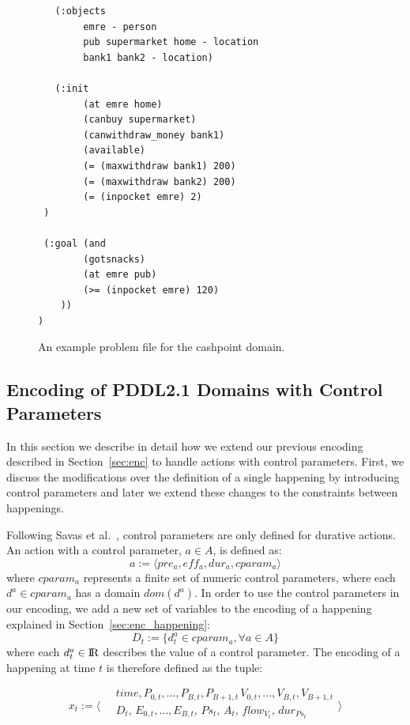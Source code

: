 \begin{figure}[thb]
\small
\begin{verbatim}
   (:objects
        emre - person
        pub supermarket home - location
        bank1 bank2 - location)
 
   (:init
        (at emre home)
        (canbuy supermarket)
        (canwithdraw_money bank1)
 		(available)
        (= (maxwithdraw bank1) 200)
        (= (maxwithdraw bank2) 200)
        (= (inpocket emre) 2)
 )
		
 (:goal (and
        (gotsnacks)
        (at emre pub)
        (>= (inpocket emre) 120)
    ))
)      
\end{verbatim}
\caption{An example problem file for the cashpoint domain.}
\label{fig:cashpoint problem}
\end{figure}

\subsection{Encoding of PDDL2.1 Domains with Control Parameters}

In this section we describe in detail how we extend our previous encoding described in Section~\ref{sec:enc} to handle actions with control parameters. First, we discuss the modifications over the definition of a single happening by introducing control parameters and later we extend these changes to the constraints between happenings.

Following Savas et al.~\cite{savas2016planning}, control parameters are only defined for durative actions. An action with a control parameter, $a\in A$, is defined as:
$$
a := \langle pre_a, eff_a, dur_a, cparam_a \rangle
$$
where $cparam_a$ represents a finite set of numeric control parameters, where each $d^a \in cparam_a$ has a domain $dom(d^a)$. In order to use the control parameters in our encoding, we add a new set of variables to the encoding of a happening explained in Section~\ref{sec:enc_happening}:
$$
D_t := \{ d^a_t \in cparam_a, \forall a\in A \}
$$
where each $d^a_t\in {\rm I\!R}$ describes the value of a control parameter. The encoding of a happening at time $t$ is therefore defined as the tuple:

$$
x_t:=\Bigg \langle 
\begin{array}{l}
\quad time,P_{0,t},\ldots,P_{B,t},P_{B+1,t}\,V_{0,t},\ldots, V_{B,t},V_{B+1,t}\\
\quad D_t,\,E_{0,t},\ldots,E_{B,t},\,Ps_t,\,A_t,\,flow_{V_t},\,dur_{Ps_t}\\
\end{array}
\Bigg \rangle 
$$

